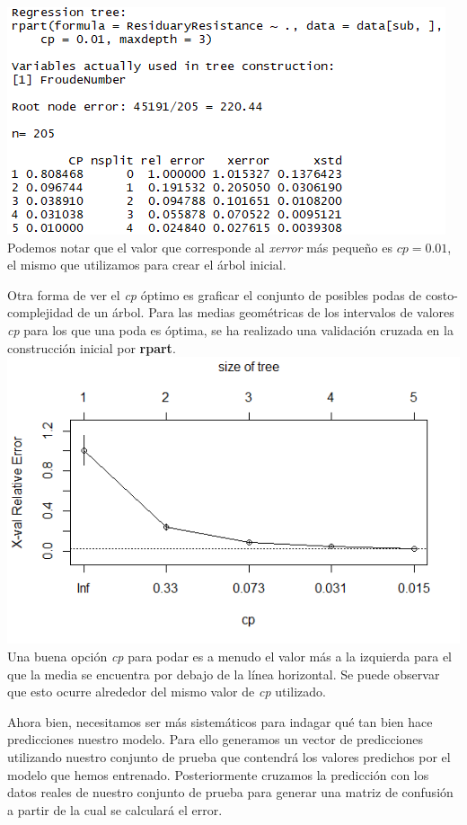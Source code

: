 \documentclass[twoside]{article}
\begin{document}
\begin{multicols}{2}
\includegraphics[scale=0.5]{images/pic_38.png}\\

Podemos notar que el valor que corresponde al \textit{xerror} m\'as peque\~no es $cp = 0.01$, el mismo que utilizamos para crear el \'arbol inicial. 

Otra forma de ver el \textit{cp} \'optimo es graficar el conjunto de posibles podas de costo-complejidad de un \'arbol. Para las medias geom\'etricas de los intervalos de valores \textit{cp} para los que una poda es \'optima, se ha realizado una validaci\'on cruzada en la construcci\'on inicial por \textbf{rpart}.\\

\includegraphics[scale=0.5]{images/pic_39.png}\\

Una buena opci\'on \textit{cp} para podar es a menudo el valor m\'as a la izquierda para el que la media se encuentra por debajo de la l\'inea horizontal. Se puede observar que esto ocurre alrededor del mismo valor de \textit{cp} utilizado.

Ahora bien, necesitamos ser m\'as sistem\'aticos para indagar qu\'e tan bien hace predicciones nuestro modelo. Para ello generamos un vector de predicciones utilizando nuestro conjunto de prueba que contendr\'a los valores predichos por el modelo que hemos entrenado. Posteriormente cruzamos la predicci\'on con los datos reales de nuestro conjunto de prueba para generar una matriz de confusi\'on a partir de la cual se calcular\'a el error.\\


\end{multicols}
\end{document}
